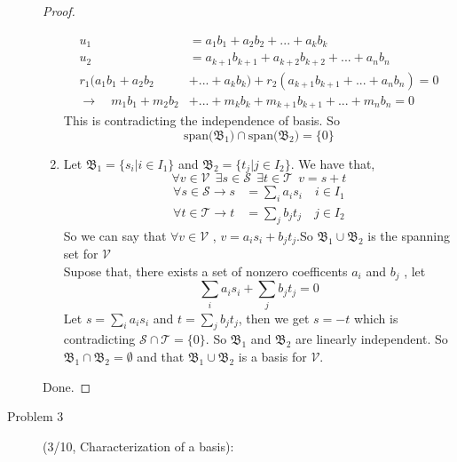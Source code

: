 \documentclass[a4paper]{article}
\begin{document}
\begin{description}
\begin{proof}
\begin{enumerate}
\begin{align*}
          u_{1}                           & =a_{1}b_{1}+a_{2}b_{2}+...+a_{k}b_{k}                     \\
          u_{2}                           & =a_{k+1}b_{k+1}+a_{k+2}b_{k+2}+...+a_{n}b_{n}             \\
          r_{1}(a_{1}b_{1} +a_{2}b_{2}    & +... +a_{k}b_{k})+ r_{2}(a_{k+1}b_{k+1}+...+a_{n}b_{n})=0 \\
          \to\quad  m_{1}b_{1}+m_{2}b_{2} & +...+m_{k}b_{k}+m_{k+1}b_{k+1}+...+m_{n}b_{n}=0
         \end{align*}
         This is contradicting the independence of basis. So
         $$\text{span($\mathfrak{B}_{1}$)}\cap\text{span($\mathfrak{B}_{2}$)}=\{0\}$$
   \item Let $\mathfrak{B}_{1}=\{s_{i} | i \in I_{1}\}$
         and $\mathfrak{B}_{2}=\{t_{j} | j \in I_{2}\}$. We have that,
         $$\forall v \in \mathcal{V}\ \  \exists s \in \mathcal{S} \ \  \exists t \in \mathcal{T} \ \ v=s+t$$
         \begin{align*}
          \forall s \in \mathcal{S} \to s & =\sum_{i} a_{i}s_{i} \quad i \in I_{1} \\
          \forall t \in \mathcal{T} \to t & =\sum_{j} b_{j}t_{j} \quad j \in I_{2}
         \end{align*}
         So we can say that $\forall v \in \mathcal{V}$  , $v=a_{i}s_{i}+b_{j}t_{j}$.So
         $\mathfrak{B}_{1}\cup \mathfrak{B}_{2}$ is the spanning set for
         $\mathcal{V}$\\
         Supose that, there exists a set of nonzero coefficents $a_{i}$ and $b_{j}$ , let
         $$\sum_{i} a_{i}s_{i}+\sum_{j} b_{j}t_{j}=0$$
         Let $s=\sum_{i} a_{i}s_{i}$ and $t=\sum_{j} b_{j}t_{j}$, then we get $s=-t$
         which is contradicting $\mathcal{S}\cap\mathcal{T}=\{0\}$. So $\mathfrak{B}_{1}$ and $\mathfrak{B}_{2}$ are linearly independent.
         So $\mathfrak{B}_{1}\cap\mathfrak{B}_{2}=\emptyset$ and that $\mathfrak{B}_{1}\cup\mathfrak{B}_{2}$ is a basis for $\mathcal{V}$.
  \end{enumerate}
  Done.
 \end{proof}
 \item[Problem 3](3/10, Characterization of a basis):{

}
\end{description}
\end{document}
